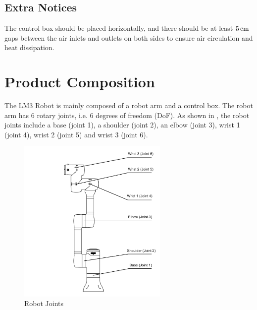
\subsection{Extra Notices}
The control box should be placed horizontally, and there should be at least $5 \,\mathrm{cm}$ gaps between the air inlets and outlets on both sides to ensure air circulation and heat dissipation.





\section{Product Composition}

The LM3 Robot is mainly composed of a robot arm and a control box. The robot arm has 6 rotary joints, i.e. 6 degrees of freedom (DoF). As shown in , the robot joints include a base (joint 1), a shoulder (joint 2), an elbow (joint 3), wrist 1 (joint 4), wrist 2 (joint 5) and wrist 3 (joint 6).

\begin{figure}[ht]
    \centering
    \includegraphics[height=8cm]{image/arms.pdf}
    \caption{Robot Joints}
    \label{fig:机器人关节示意图}
\end{figure}

